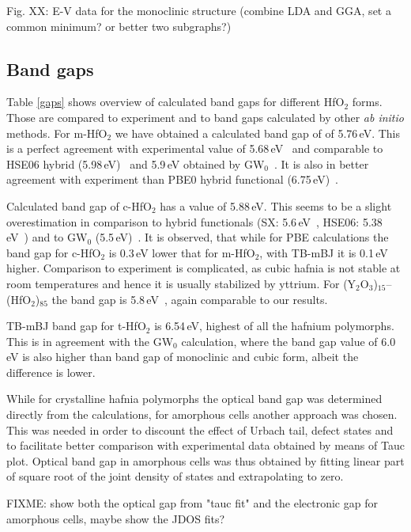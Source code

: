 \documentclass[10pt,a4paper,twocolumn]{article}
\begin{document}
Fig. XX: E-V data for the monoclinic structure (combine LDA and GGA, set a common minimum? or better two subgraphs?)


\subsection{Band gaps}

Table \ref{gaps} shows overview of calculated band gaps for different HfO$_2$ forms.
Those are compared to experiment and to band gaps calculated by other \textit{ab initio} methods.
For m-HfO$_2$ we have obtained a calculated band gap of of 5.76\,eV.
This is a perfect agreement with experimental value of 5.68\,eV~\cite{Balog1977} and comparable to HSE06 hybrid (5.98\,eV)~\cite{Komsa2010} and 5.9\,eV obtained by GW$_0$~\cite{Gruning2010}.
It is also in better agreement with experiment than PBE0 hybrid functional (6.75\,eV)~\cite{Komsa2010}.

Calculated band gap of c-HfO$_2$ has a value of 5.88\,eV.
This seems to be a slight overestimation in comparison to hybrid functionals (SX: 5.6\,eV~\cite{Clark2010}, HSE06: 5.38\,eV~\cite{Yang2014}) and to GW$_0$ (5.5\,eV)~\cite{Gruning2010}.
It is observed, that while for PBE calculations the band gap for c-HfO$_2$ is 0.3\,eV lower that for m-HfO$_2$, with TB-mBJ it is 0.1\,eV higher.
Comparison to experiment is complicated, as cubic hafnia is not stable at room temperatures and hence it is usually stabilized by yttrium.
For (Y$_2$O$_3$)$_{15}$--(HfO$_2$)$_{85}$ the band gap is 5.8\,eV~\cite{Lim2002}, again comparable to our results.

TB-mBJ band gap for t-HfO$_2$ is 6.54\,eV, highest of all the hafnium polymorphs.
This is in agreement with the GW$_0$ calculation, where the band gap value of 6.0\,eV is also higher than band gap of monoclinic and cubic form, albeit the difference is lower.

While for crystalline hafnia polymorphs the optical band gap was determined directly from the calculations, for amorphous cells another approach was chosen.
This was needed in order to discount the effect of Urbach tail, defect states and to facilitate better comparison with experimental data obtained by means of Tauc plot.
Optical band gap in amorphous cells was thus obtained by fitting linear part of square root of the joint density of states and extrapolating to zero.

FIXME: show both the optical gap from "tauc fit" and the electronic gap for amorphous cells, maybe show the JDOS fits?
\end{document}
